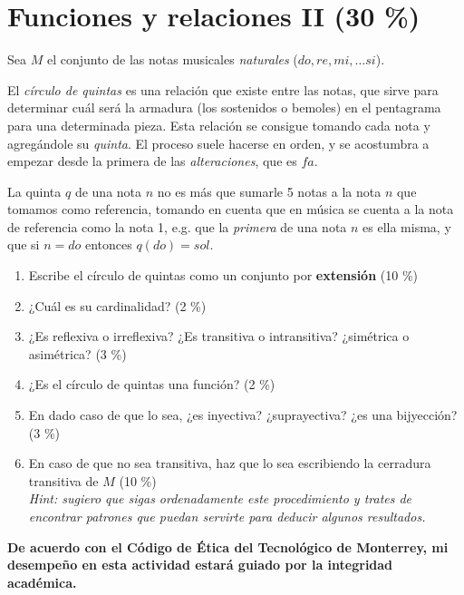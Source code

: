 \documentclass{article}
\begin{document}
\section{Funciones y relaciones II (30 \%)}

Sea $M$ el conjunto de las notas musicales \textit{naturales} ($do, re, mi, \dots si$).

El \textit{círculo de quintas} es una relación que existe entre las notas, que sirve para determinar cuál será la armadura (los sostenidos o bemoles) en el pentagrama para una determinada pieza.
Esta relación se consigue tomando cada nota y agregándole su \textit{quinta}.
El proceso suele hacerse en orden, y se acostumbra a empezar desde la primera de las \textit{alteraciones}, que es $fa$.

La quinta $q$ de una nota $n$ no es más que sumarle 5 notas a la nota $n$ que tomamos como referencia, tomando en cuenta que en música se cuenta a la nota de referencia como la nota 1, e.g. que la \textit{primera} de una nota $n$ es ella misma, y que si $n = do$ entonces $q(do) = sol$.

\begin{enumerate}[label=\tt \alph*)]
    \item Escribe el círculo de quintas como un conjunto por \textbf{extensión} (10 \%)
    \item ¿Cuál es su cardinalidad? (2 \%)
    \item ¿Es reflexiva o irreflexiva? ¿Es transitiva o intransitiva? ¿simétrica o asimétrica? (3 \%)
    \item ¿Es el círculo de quintas una función? (2 \%)
    \item En dado caso de que lo sea, ¿es inyectiva? ¿suprayectiva? ¿es una bijyección? (3 \%)
    \item En caso de que no sea transitiva, haz que lo sea escribiendo la cerradura transitiva de $M$ (10 \%)\\
    {\footnotesize \textit{Hint: sugiero que sigas ordenadamente este procedimiento y trates de encontrar patrones que puedan servirte para deducir algunos resultados.}}
\end{enumerate}

\vfill

\textbf{De acuerdo con el Código de Ética del Tecnológico de Monterrey, mi desempeño en esta actividad estará guiado por la integridad académica.}
\end{document}
